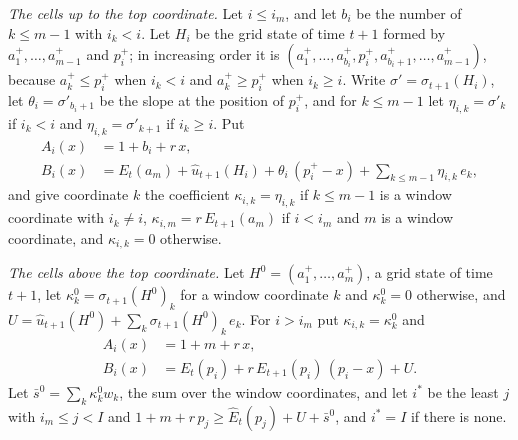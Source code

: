 \documentclass[11pt]{amsart}
\theoremstyle{definition}
\numberwithin{equation}{section}
\begin{document}
\emph{The cells up to the top coordinate.} Let $i\le i_m$, and let $b_i$ be the number of $k\le m-1$ with $i_k<i$. Let $H_i$ be the grid state of time $t+1$ formed by $a_1^+,\dots,a_{m-1}^+$ and $p_i^+$; in increasing order it is $(a_1^+,\dots,a_{b_i}^+,p_i^+,a_{b_i+1}^+,\dots,a_{m-1}^+)$, because $a_k^+\le p_i^+$ when $i_k<i$ and $a_k^+\ge p_i^+$ when $i_k\ge i$. Write $\sigma'=\sigma_{t+1}(H_i)$, let $\theta_i=\sigma'_{b_i+1}$ be the slope at the position of $p_i^+$, and for $k\le m-1$ let $\eta_{i,k}=\sigma'_k$ if $i_k<i$ and $\eta_{i,k}=\sigma'_{k+1}$ if $i_k\ge i$. Put
\begin{align*}
A_i(x)&=1+b_i+r\,x,\\
B_i(x)&=E_t(a_m)+\hat u_{t+1}(H_i)+\theta_i\,(p_i^+-x)+\sum_{k\le m-1}\eta_{i,k}\,e_k,
\end{align*}
and give coordinate $k$ the coefficient $\kappa_{i,k}=\eta_{i,k}$ if $k\le m-1$ is a window coordinate with $i_k\ne i$, $\kappa_{i,m}=r\,E_{t+1}(a_m)$ if $i<i_m$ and $m$ is a window coordinate, and $\kappa_{i,k}=0$ otherwise.

\emph{The cells above the top coordinate.} Let $H^0=(a_1^+,\dots,a_m^+)$, a grid state of time $t+1$, let $\kappa^0_k=\sigma_{t+1}(H^0)_k$ for a window coordinate $k$ and $\kappa^0_k=0$ otherwise, and $U=\hat u_{t+1}(H^0)+\sum_k\sigma_{t+1}(H^0)_k\,e_k$. For $i>i_m$ put $\kappa_{i,k}=\kappa^0_k$ and
\begin{align*}
A_i(x)&=1+m+r\,x,\\
B_i(x)&=E_t(p_i)+r\,E_{t+1}(p_i)\,(p_i-x)+U.
\end{align*}
Let $\bar s^0=\sum_k\kappa^0_kw_k$, the sum over the window coordinates, and let $i^*$ be the least $j$ with $i_m\le j<I$ and $1+m+r\,p_j\ge\hat E_t(p_j)+U+\bar s^0$, and $i^*=I$ if there is none.
\end{document}
